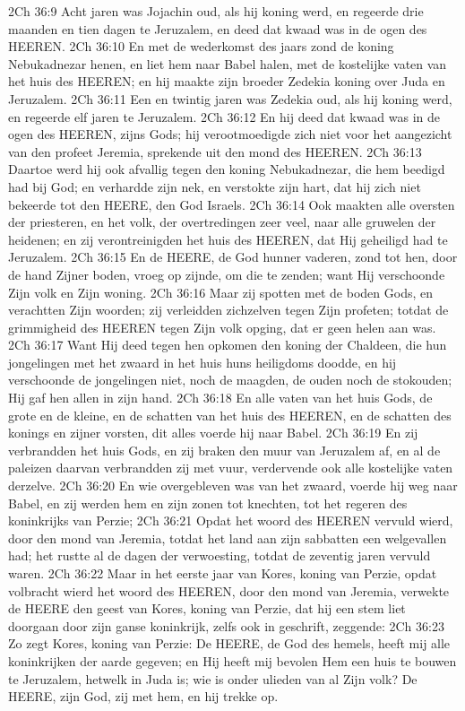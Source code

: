 2Ch 36:9  Acht jaren was Jojachin oud, als hij koning werd, en regeerde drie maanden en tien dagen te Jeruzalem, en deed dat kwaad was in de ogen des HEEREN.
2Ch 36:10  En met de wederkomst des jaars zond de koning Nebukadnezar henen, en liet hem naar Babel halen, met de kostelijke vaten van het huis des HEEREN; en hij maakte zijn broeder Zedekia koning over Juda en Jeruzalem.
2Ch 36:11  Een en twintig jaren was Zedekia oud, als hij koning werd, en regeerde elf jaren te Jeruzalem.
2Ch 36:12  En hij deed dat kwaad was in de ogen des HEEREN, zijns Gods; hij verootmoedigde zich niet voor het aangezicht van den profeet Jeremia, sprekende uit den mond des HEEREN.
2Ch 36:13  Daartoe werd hij ook afvallig tegen den koning Nebukadnezar, die hem beedigd had bij God; en verhardde zijn nek, en verstokte zijn hart, dat hij zich niet bekeerde tot den HEERE, den God Israels.
2Ch 36:14  Ook maakten alle oversten der priesteren, en het volk, der overtredingen zeer veel, naar alle gruwelen der heidenen; en zij verontreinigden het huis des HEEREN, dat Hij geheiligd had te Jeruzalem.
2Ch 36:15  En de HEERE, de God hunner vaderen, zond tot hen, door de hand Zijner boden, vroeg op zijnde, om die te zenden; want Hij verschoonde Zijn volk en Zijn woning.
2Ch 36:16  Maar zij spotten met de boden Gods, en verachtten Zijn woorden; zij verleidden zichzelven tegen Zijn profeten; totdat de grimmigheid des HEEREN tegen Zijn volk opging, dat er geen helen aan was.
2Ch 36:17  Want Hij deed tegen hen opkomen den koning der Chaldeen, die hun jongelingen met het zwaard in het huis huns heiligdoms doodde, en hij verschoonde de jongelingen niet, noch de maagden, de ouden noch de stokouden; Hij gaf hen allen in zijn hand.
2Ch 36:18  En alle vaten van het huis Gods, de grote en de kleine, en de schatten van het huis des HEEREN, en de schatten des konings en zijner vorsten, dit alles voerde hij naar Babel.
2Ch 36:19  En zij verbrandden het huis Gods, en zij braken den muur van Jeruzalem af, en al de paleizen daarvan verbrandden zij met vuur, verdervende ook alle kostelijke vaten derzelve.
2Ch 36:20  En wie overgebleven was van het zwaard, voerde hij weg naar Babel, en zij werden hem en zijn zonen tot knechten, tot het regeren des koninkrijks van Perzie;
2Ch 36:21  Opdat het woord des HEEREN vervuld wierd, door den mond van Jeremia, totdat het land aan zijn sabbatten een welgevallen had; het rustte al de dagen der verwoesting, totdat de zeventig jaren vervuld waren.
2Ch 36:22  Maar in het eerste jaar van Kores, koning van Perzie, opdat volbracht wierd het woord des HEEREN, door den mond van Jeremia, verwekte de HEERE den geest van Kores, koning van Perzie, dat hij een stem liet doorgaan door zijn ganse koninkrijk, zelfs ook in geschrift, zeggende:
2Ch 36:23  Zo zegt Kores, koning van Perzie: De HEERE, de God des hemels, heeft mij alle koninkrijken der aarde gegeven; en Hij heeft mij bevolen Hem een huis te bouwen te Jeruzalem, hetwelk in Juda is; wie is onder ulieden van al Zijn volk? De HEERE, zijn God, zij met hem, en hij trekke op.



